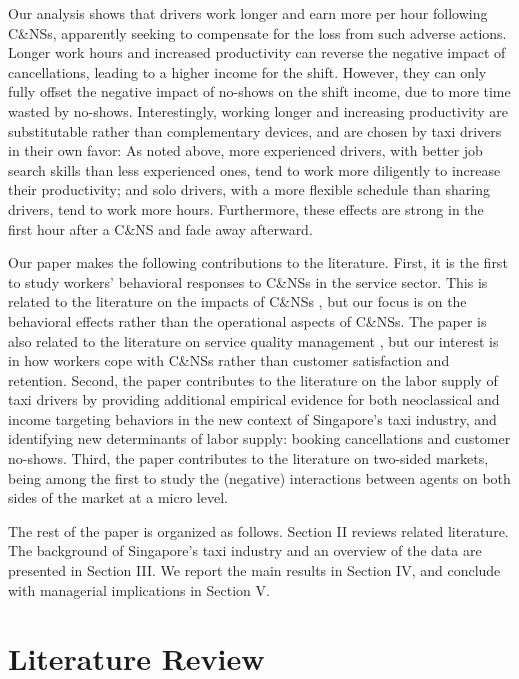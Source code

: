\documentclass[reviewmode]{AEA}
\begin{document}
Our analysis shows that drivers work longer and earn more per hour following C\&NSs, apparently seeking to compensate for the loss from such adverse actions. Longer work hours and increased productivity can reverse the negative impact of cancellations, leading to a higher income for the shift. However, they can only fully offset the negative impact of no-shows on the shift income, due to more time wasted by no-shows. Interestingly, working longer and increasing productivity are substitutable rather than complementary devices, and are chosen by taxi drivers in their own favor: As noted above, more experienced drivers, with better job search skills than less experienced ones, tend to work more diligently to increase their productivity; and solo drivers, with a more flexible schedule than sharing drivers, tend to work more hours. Furthermore, these effects are strong in the first hour after a C\&NS and fade away afterward. 

Our paper makes the following contributions to the literature. First, it is the first to study workers' behavioral responses to C\&NSs in the service sector. This is related to the literature on the impacts of C\&NSs \citep{moore2001time,patrick2008reducing,norris2014empirical,feldman2014appointment}, but our focus is on the behavioral effects rather than the operational aspects of C\&NSs. The paper is also related to the literature on service quality management \citep{cohen2018frustration}, but our interest is in how workers cope with C\&NSs rather than customer satisfaction and retention. Second, the paper contributes to the literature on the labor supply of taxi drivers by providing additional empirical evidence for both neoclassical and income targeting behaviors in the new context of Singapore's taxi industry, and identifying new determinants of labor supply: booking cancellations and customer no-shows. Third, the paper contributes to the literature on two-sided markets, being among the first to study the (negative) interactions between agents on both sides of the market at a micro level.


The rest of the paper is organized as follows. Section II reviews related literature. The background of Singapore's taxi industry and an overview of the data are presented in Section III.  We report the main results in Section IV, 
and conclude with  managerial implications in Section V.

\section{Literature Review}
\end{document}
